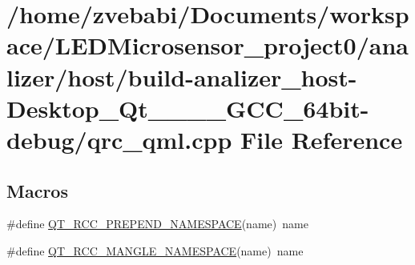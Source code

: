 \hypertarget{build-analizer__host-_desktop___qt__5__9__0___g_c_c__64bit-debug_2qrc__qml_8cpp}{\section{/home/zvebabi/\+Documents/workspace/\+L\+E\+D\+Microsensor\+\_\+project0/analizer/host/build-\/analizer\+\_\+host-\/\+Desktop\+\_\+\+Qt\+\_\+\_\+\_\+\_\+\+G\+C\+C\+\_\+64bit-\/debug/qrc\+\_\+qml.cpp File Reference}
\label{build-analizer__host-_desktop___qt__5__9__0___g_c_c__64bit-debug_2qrc__qml_8cpp}
}
\subsection*{Macros}
\begin{DoxyCompactItemize}
\item 
\#define \hyperlink{build-analizer__host-_desktop___qt__5__9__0___g_c_c__64bit-debug_2qrc__qml_8cpp_afbfc3bb3cd2fa03dd0a3fc36563480d6}{Q\+T\+\_\+\+R\+C\+C\+\_\+\+P\+R\+E\+P\+E\+N\+D\+\_\+\+N\+A\+M\+E\+S\+P\+A\+C\+E}(name)~name
\item 
\#define \hyperlink{build-analizer__host-_desktop___qt__5__9__0___g_c_c__64bit-debug_2qrc__qml_8cpp_a590f80ddb226779f6f432d80438ea190}{Q\+T\+\_\+\+R\+C\+C\+\_\+\+M\+A\+N\+G\+L\+E\+\_\+\+N\+A\+M\+E\+S\+P\+A\+C\+E}(name)~name
\end{DoxyCompactItemize}
